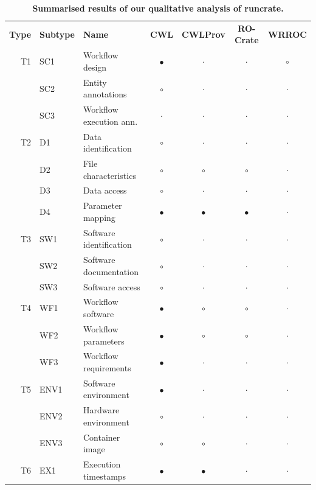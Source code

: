 \documentclass[10pt,letterpaper]{article}
\newlength\savedwidth
\newcommand\thickhline{\noalign{\global\savedwidth\arrayrulewidth\global\arrayrulewidth 2pt}%
\hline
\noalign{\global\arrayrulewidth\savedwidth}}
\begin{document}
\begin{table}[!ht]
\begin{adjustwidth}{-1.4cm}{0in} %
\centering
\caption{
{\bf Summarised results of our qualitative analysis of runcrate.}}
\begin{tabular}{r|l|l|c|c|c|c}
\hline
{\bf Type} & {\bf Subtype} & {\bf Name} & {\bf CWL} & {\bf CWLProv} & {\bf RO-Crate} & {\bf WRROC}  \\ \thickhline
T1 & SC1 & Workflow design & $\bullet$ &  $\cdot$  &  $\cdot$ & $\circ$ \\ 
& SC2 & Entity annotations & $\circ$ &  $\cdot$  &  $\cdot$  & $\cdot$ \\ 
& SC3 & Workflow execution ann.  &  $\cdot$  & $\cdot$ &  $\cdot$ & $\cdot$ \\ \hline
T2 & D1 & Data identification & $\circ$ & $\cdot$ &  $\cdot$ & $\cdot$ \\
& D2 & File characteristics & $\circ$ & $\circ$ & $\circ$ & $\cdot$ \\
& D3 & Data access & $\circ$ &  $\cdot$  &  $\cdot$  & $\cdot$ \\ 
& D4 & Parameter mapping & $\bullet$ & $\bullet$ & $\bullet$ & $\cdot$\\ \hline 
T3 & SW1 & Software identification & $\circ$ &  $\cdot$  &  $\cdot$ & $\cdot$ \\ 
& SW2 & Software documentation & $\circ$ &  $\cdot$  &  $\cdot$ & $\cdot$ \\  
& SW3 & Software access & $\circ$ &  $\cdot$  &  $\cdot$ & $\cdot$ \\ \hline 
T4 & WF1 & Workflow software & $\bullet$ & $\circ$ & $\circ$ & $\cdot$\\ 
& WF2 & Workflow parameters & $\bullet$ & $\circ$ & $\circ$ & $\cdot$\\ 
& WF3 & Workflow requirements & $\bullet$ &  $\cdot$  &  $\cdot$  & $\cdot$\\ \hline 
T5 & ENV1 & Software environment & $\bullet$ & $\cdot$ &  $\cdot$ & $\cdot$ \\ 
& ENV2 & Hardware environment & $\circ$ & $\cdot$ &  $\cdot$  & $\cdot$\\ 
& ENV3 & Container image & $\circ$ & $\circ$ &  $\cdot$ & $\cdot$ \\ \hline 
T6 & EX1 & Execution timestamps & $\bullet$ & $\bullet$ &  $\cdot$ & $\cdot$ \\ 

\end{tabular}
\end{adjustwidth}
\end{table}
\end{document}
